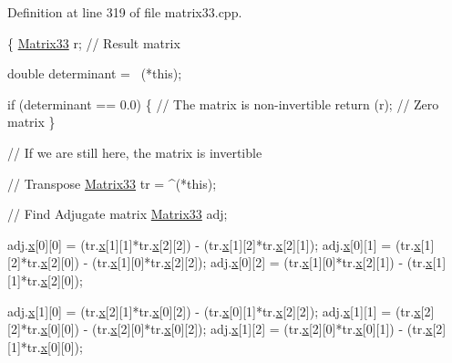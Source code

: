 Definition at line 319 of file matrix33.\-cpp.


\begin{DoxyCode}
\{
  \hyperlink{classMatrix33}{Matrix33} r;   \textcolor{comment}{// Result matrix}
  
  \textcolor{keywordtype}{double} determinant = ~(*this);
  
  \textcolor{keywordflow}{if} (determinant == 0.0)
    \{
      \textcolor{comment}{// The matrix is non-invertible}
      \textcolor{keywordflow}{return} (r);       \textcolor{comment}{// Zero matrix}
    \}
  
  \textcolor{comment}{// If we are still here, the matrix is invertible}
  
  \textcolor{comment}{//  Transpose}
  \hyperlink{classMatrix33}{Matrix33} tr = ^(*this);
  
  \textcolor{comment}{// Find Adjugate matrix}
  \hyperlink{classMatrix33}{Matrix33} adj;
  
  adj.\hyperlink{classMatrix33_af7f01fa466616eb7c8eda2e4d9f85cdd}{x}[0][0] = (tr.\hyperlink{classMatrix33_af7f01fa466616eb7c8eda2e4d9f85cdd}{x}[1][1]*tr.\hyperlink{classMatrix33_af7f01fa466616eb7c8eda2e4d9f85cdd}{x}[2][2]) - (tr.\hyperlink{classMatrix33_af7f01fa466616eb7c8eda2e4d9f85cdd}{x}[1][2]*tr.\hyperlink{classMatrix33_af7f01fa466616eb7c8eda2e4d9f85cdd}{x}[2][1]);
  adj.\hyperlink{classMatrix33_af7f01fa466616eb7c8eda2e4d9f85cdd}{x}[0][1] = (tr.\hyperlink{classMatrix33_af7f01fa466616eb7c8eda2e4d9f85cdd}{x}[1][2]*tr.\hyperlink{classMatrix33_af7f01fa466616eb7c8eda2e4d9f85cdd}{x}[2][0]) - (tr.\hyperlink{classMatrix33_af7f01fa466616eb7c8eda2e4d9f85cdd}{x}[1][0]*tr.\hyperlink{classMatrix33_af7f01fa466616eb7c8eda2e4d9f85cdd}{x}[2][2]);
  adj.\hyperlink{classMatrix33_af7f01fa466616eb7c8eda2e4d9f85cdd}{x}[0][2] = (tr.\hyperlink{classMatrix33_af7f01fa466616eb7c8eda2e4d9f85cdd}{x}[1][0]*tr.\hyperlink{classMatrix33_af7f01fa466616eb7c8eda2e4d9f85cdd}{x}[2][1]) - (tr.\hyperlink{classMatrix33_af7f01fa466616eb7c8eda2e4d9f85cdd}{x}[1][1]*tr.\hyperlink{classMatrix33_af7f01fa466616eb7c8eda2e4d9f85cdd}{x}[2][0]);
  
  adj.\hyperlink{classMatrix33_af7f01fa466616eb7c8eda2e4d9f85cdd}{x}[1][0] = (tr.\hyperlink{classMatrix33_af7f01fa466616eb7c8eda2e4d9f85cdd}{x}[2][1]*tr.\hyperlink{classMatrix33_af7f01fa466616eb7c8eda2e4d9f85cdd}{x}[0][2]) - (tr.\hyperlink{classMatrix33_af7f01fa466616eb7c8eda2e4d9f85cdd}{x}[0][1]*tr.\hyperlink{classMatrix33_af7f01fa466616eb7c8eda2e4d9f85cdd}{x}[2][2]);
  adj.\hyperlink{classMatrix33_af7f01fa466616eb7c8eda2e4d9f85cdd}{x}[1][1] = (tr.\hyperlink{classMatrix33_af7f01fa466616eb7c8eda2e4d9f85cdd}{x}[2][2]*tr.\hyperlink{classMatrix33_af7f01fa466616eb7c8eda2e4d9f85cdd}{x}[0][0]) - (tr.\hyperlink{classMatrix33_af7f01fa466616eb7c8eda2e4d9f85cdd}{x}[2][0]*tr.\hyperlink{classMatrix33_af7f01fa466616eb7c8eda2e4d9f85cdd}{x}[0][2]);
  adj.\hyperlink{classMatrix33_af7f01fa466616eb7c8eda2e4d9f85cdd}{x}[1][2] = (tr.\hyperlink{classMatrix33_af7f01fa466616eb7c8eda2e4d9f85cdd}{x}[2][0]*tr.\hyperlink{classMatrix33_af7f01fa466616eb7c8eda2e4d9f85cdd}{x}[0][1]) - (tr.\hyperlink{classMatrix33_af7f01fa466616eb7c8eda2e4d9f85cdd}{x}[2][1]*tr.\hyperlink{classMatrix33_af7f01fa466616eb7c8eda2e4d9f85cdd}{x}[0][0]);
  

\end{DoxyCode}
